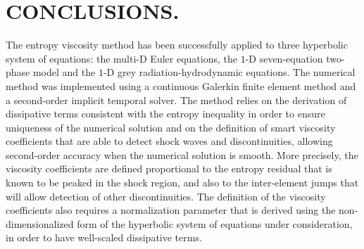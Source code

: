 %
%
%


\chapter{\uppercase {Conclusions.}}\label{chap:conclusion}

The entropy viscosity method has been successfully applied to three hyperbolic system of equations: the multi-D Euler equations, the $1$-D seven-equation two-phase model and the $1$-D grey radiation-hydrodynamic equations. The numerical method was implemented using a continuous Galerkin finite element method and a second-order implicit temporal solver. The method relies on the derivation of dissipative terms consistent with the entropy inequality in order to ensure uniqueness of the numerical solution and on the definition of smart viscosity coefficients that are able to detect shock waves and discontinuities, allowing second-order accuracy when the numerical solution is smooth. More precisely, the viscosity coefficients are defined proportional to the entropy residual that is known to be peaked in the shock region, and also to the inter-element jumps that will allow detection of other discontinuities. The definition of the viscosity coefficients also requires a normalization parameter that is derived using the non-dimensionalized form of the hyperbolic system of equations under consideration, in order to have well-scaled dissipative terms.

